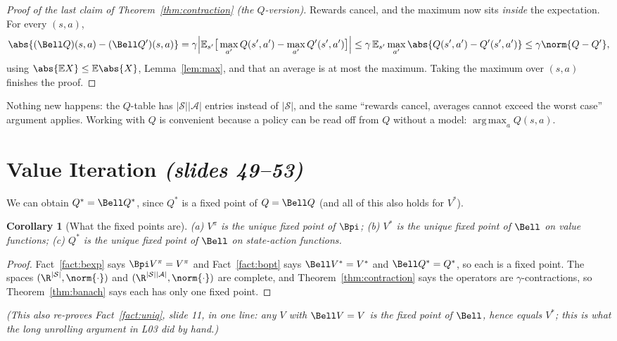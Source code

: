 \documentclass[11pt,a4paper]{article}
\newcommand{\E}{\mathbb{E}}
\DeclareMathOperator*{\argmax}{arg\,max}
\newcommand{\slides}[1]{\emph{(slides #1)}}
\newcommand{\cS}{\mathcal{S}}
\newcommand{\cA}{\mathcal{A}}
\theoremstyle{plain}
\newtheorem{corollary}[theorem]{Corollary}
\theoremstyle{definition}
\theoremstyle{remark}
\begin{document}
\begin{proof}[Proof of the last claim of Theorem~\ref{thm:contraction} (the $Q$-version)]
Rewards cancel, and the maximum now sits \emph{inside} the expectation. For every $(s,a)$,
\[
\abs{(\Bell Q)(s,a)-(\Bell Q')(s,a)}
=\gamma\Big|\E_{s'}\big[\max_{a'}Q(s',a')-\max_{a'}Q'(s',a')\big]\Big|
\le\gamma\,\E_{s'}\max_{a'}\abs{Q(s',a')-Q'(s',a')}
\le\gamma\norm{Q-Q'},
\]
using $\abs{\E X}\le\E\abs{X}$, Lemma~\ref{lem:max}, and that an average is at most the maximum. Taking the maximum over $(s,a)$ finishes the proof.
\end{proof}

\begin{intuition}
Nothing new happens: the $Q$-table has $|\cS||\cA|$ entries instead of $|\cS|$, and the same ``rewards cancel, averages cannot exceed the worst case'' argument applies. Working with $Q$ is convenient because a policy can be read off from $Q$ without a model: $\argmax_aQ(s,a)$.
\end{intuition}

\section{Value Iteration \slides{49--53}}\label{sec:vi}
We can obtain $Q^*=\Bell Q^*$, since $Q^*$ is a fixed point of $Q=\Bell Q$ (and all of this also holds for $V^*$).

\begin{corollary}[What the fixed points are]\label{cor:fixed}
\emph{(a)} $V^\pi$ is the unique fixed point of $\Bpi$; \emph{(b)} $V^*$ is the unique fixed point of $\Bell$ on value functions; \emph{(c)} $Q^*$ is the unique fixed point of $\Bell$ on state-action functions.
\end{corollary}
\begin{proof}
Fact~\ref{fact:bexp} says $\Bpi V^\pi=V^\pi$ and Fact~\ref{fact:bopt} says $\Bell V^*=V^*$ and $\Bell Q^*=Q^*$, so each is a fixed point. The spaces $(\R^{|\cS|},\norm{\cdot})$ and $(\R^{|\cS||\cA|},\norm{\cdot})$ are complete, and Theorem~\ref{thm:contraction} says the operators are $\gamma$-contractions, so Theorem~\ref{thm:banach} says each has only one fixed point.
\end{proof}
\emph{(This also re-proves Fact~\ref{fact:uniq}, slide 11, in one line: any $V$ with $\Bell V=V$ is the fixed point of $\Bell$, hence equals $V^*$; this is what the long unrolling argument in L03 did by hand.)}
\end{document}
